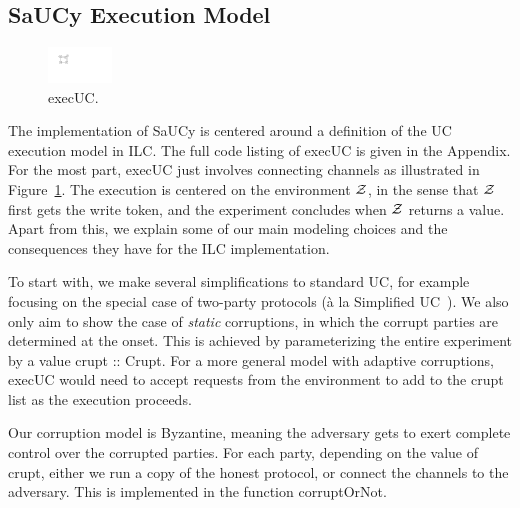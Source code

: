 \subsection{SaUCy Execution Model}
\label{subsec:concrete-uc}
\begingroup
\setlength\intextsep{0pt}
\setlength{\columnsep}{10pt}
\begin{figure}
\centering
\includegraphics[width=0.15\textwidth]{graphics/execUC}
\caption{\textsf{execUC}.}
\label{fig:execUC-diagram}
\end{figure}
The implementation of SaUCy is centered around a definition of the UC execution
model in ILC.  The full code listing of \textsf{execUC} is given in the
Appendix.  For the most part, \textsf{execUC} just involves connecting channels
as illustrated in Figure~\ref{fig:execUC-diagram}.  The execution is centered on
the environment $\mathcal{{Z}}$, in the sense that $\mathcal{{Z}}$ first gets the write token,
and the experiment concludes when $\mathcal{{Z}}$ returns a value.  Apart from this, we
explain some of our main modeling choices and the consequences they have for the
ILC implementation.

To start with, we make several simplifications to standard UC, for example
focusing on the special case of two-party protocols (\`{a} la Simplified
UC~\cite{canetti2015simpler}).  We also only aim to show the case of
\emph{static} corruptions, in which the corrupt parties are determined at the
onset.  This is achieved by parameterizing the entire experiment by a value
\textsf{crupt :: Crupt}.  For a more general model with adaptive corruptions,
\textsf{execUC} would need to accept requests from the environment to add to the
\textsf{crupt} list as the execution proceeds.

Our corruption model is Byzantine, meaning the adversary gets to exert complete
control over the corrupted parties.
For each party, depending on the value of \textsf{crupt}, either we run a copy
of the honest protocol, or connect the channels to the adversary. This is
implemented in the function \textsf{corruptOrNot}.

